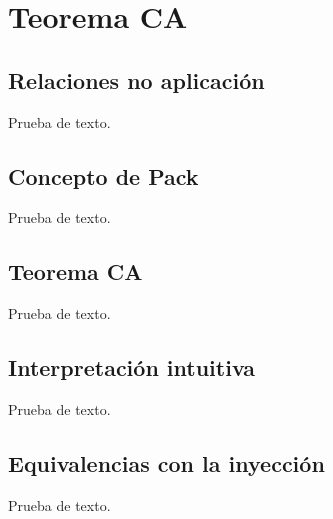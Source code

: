 \chapter{Teorema CA}

\newpage
\section{Relaciones no aplicación}
Prueba de texto.

\newpage
\section{Concepto de Pack}
Prueba de texto.

\newpage
\section{Teorema CA}
Prueba de texto.

\newpage
\section{Interpretación intuitiva}
Prueba de texto.

\newpage
\section{Equivalencias con la inyección}
Prueba de texto.